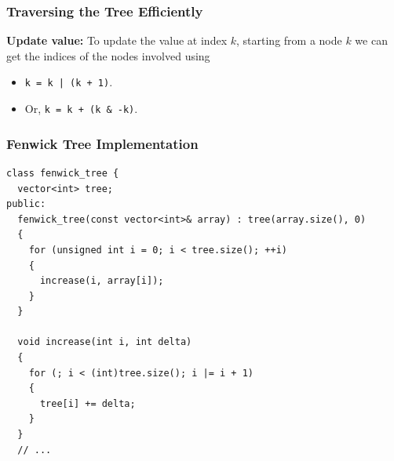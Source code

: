 \documentclass{beamer}
\begin{document}
\begin{frame}%
\frametitle{Traversing the Tree Efficiently}

\footnotesize

\textbf{Update value:} To update the value at index $k$, starting from a node $k$ we can get the
indices of the nodes involved using
\begin{itemize}
\footnotesize
\item<1-> \texttt{k = k | (k + 1)}.
\item<1-> Or, \texttt{k = k + (k \& -k)}.
\end{itemize}


\vspace{-0.1cm}


\end{frame}

\begin{frame}[containsverbatim]
\frametitle{Fenwick Tree Implementation}

\scriptsize

\begin{lstlisting}[mathescape]
class fenwick_tree {
  vector<int> tree;
public:
  fenwick_tree(const vector<int>& array) : tree(array.size(), 0)
  {
    for (unsigned int i = 0; i < tree.size(); ++i)
    {
      increase(i, array[i]);
    }
  }

  void increase(int i, int delta)
  {
    for (; i < (int)tree.size(); i |= i + 1)
    {
      tree[i] += delta;
    }
  }
  // ...
\end{lstlisting}

\end{frame}
\end{document}
